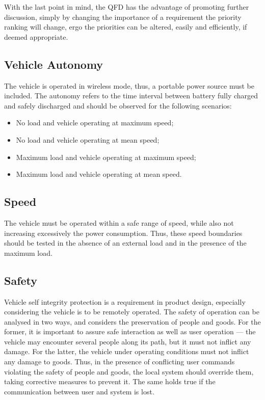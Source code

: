 With the last point in mind, the QFD has the advantage of promoting further
discussion, simply by changing the importance of a requirement the priority ranking will change, ergo
the priorities can be altered, easily and efficiently, if deemed appropriate.
\newpage
%
\subsection{Vehicle Autonomy}%
\label{sec:autonomy-specs}
The vehicle is operated in wireless mode, thus, a portable power source must be included. The autonomy refers to the time interval between battery fully charged and safely discharged and should be observed for the following scenarios:
\begin{itemize}
\item No load and vehicle operating at maximum speed;
\item No load and vehicle operating at mean speed;
\item Maximum load and vehicle operating at maximum speed;
\item Maximum load and vehicle operating at mean speed.
\end{itemize}
\subsection{Speed}%
\label{sec:speed-tests}
The vehicle must be operated within a safe range of speed, while also not increasing excessively the power consumption. Thus, these speed boundaries should be tested in the absence of an external load and in the presence of the maximum load.
\subsection{Safety}%
\label{sec:org83942c3}
Vehicle self integrity protection is a requirement in product design, especially considering the vehicle is to
be remotely operated. The safety of operation can be analysed in two ways, and considers the
preservation of people and goods. For the former, it is important to assure safe interaction as well as user operation --- the vehicle may encounter
several people along its path, but it must not inflict any damage. For the
latter, the vehicle under operating conditions must not inflict any damage to
goods. Thus, in the presence of conflicting user commands violating the safety
of people and goods, the local system should override them, taking corrective
measures to prevent it. The same holds true if the communication between user
and system is lost.
